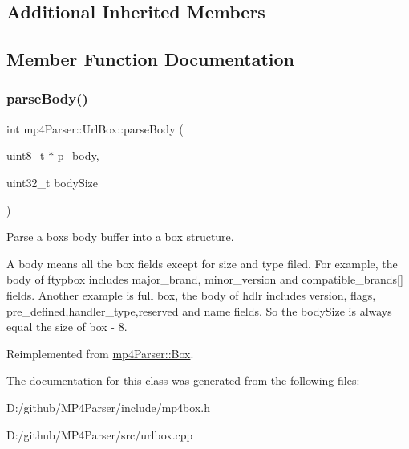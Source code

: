\subsection*{Additional Inherited Members}


\subsection{Member Function Documentation}
\mbox{\label{classmp4_parser_1_1_url_box_a150ab47ee00eca2f2f6c37ae12946cf6}} 
\subsubsection{\texorpdfstring{parseBody()}{parseBody()}}
{\footnotesize\ttfamily int mp4\+Parser\+::\+Url\+Box\+::parse\+Body (\begin{DoxyParamCaption}\item[{uint8\+\_\+t $\ast$}]{p\+\_\+body,  }\item[{uint32\+\_\+t}]{body\+Size }\end{DoxyParamCaption})\hspace{0.3cm}{\ttfamily [virtual]}}



Parse a box\textquotesingle{}s body buffer into a box structure. 

A body means all the box fields except for size and type filed. For example, the body of ftypbox includes major\+\_\+brand, minor\+\_\+version and compatible\+\_\+brands\mbox{[}\mbox{]} fields. Another example is full box, the body of hdlr includes version, flags, pre\+\_\+defined,handler\+\_\+type,reserved and name fields. So the body\+Size is always equal the size of box -\/ 8. 

Reimplemented from \mbox{\hyperlink{classmp4_parser_1_1_box_a3dd0c084ac65bc77b69ac5ecaf796cb2}{mp4\+Parser\+::\+Box}}.



The documentation for this class was generated from the following files\+:\begin{DoxyCompactItemize}
\item 
D\+:/github/\+M\+P4\+Parser/include/mp4box.\+h\item 
D\+:/github/\+M\+P4\+Parser/src/urlbox.\+cpp\end{DoxyCompactItemize}
